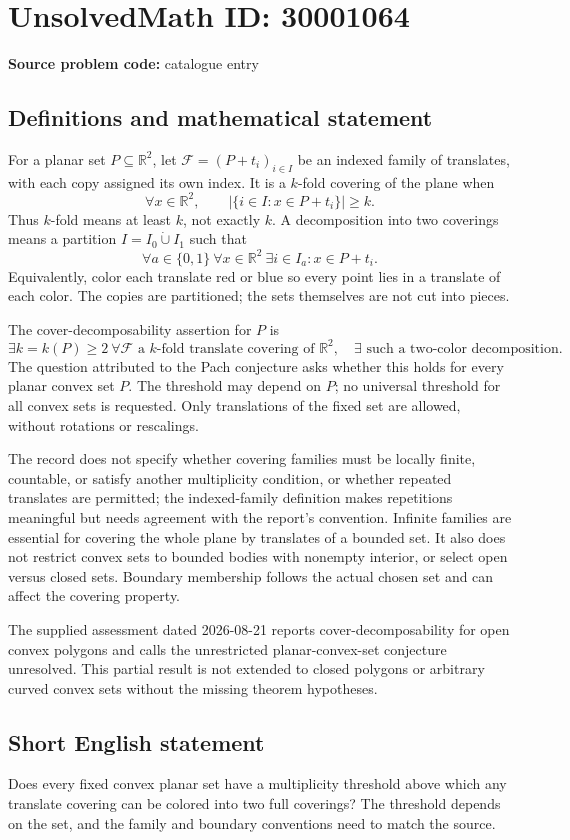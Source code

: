 \documentclass[11pt]{article}
\newcommand{\R}{\mathbb{R}}
\begin{document}
\section*{UnsolvedMath ID: 30001064}
\textbf{Source problem code:} catalogue entry
\subsection{Definitions and mathematical statement}
For a planar set \(P\subseteq\R^2\), let \(\mathcal F=(P+t_i)_{i\in I}\) be an indexed family of translates, with each copy assigned its own index. It is a \(k\)-fold covering of the plane when
\[
 \forall x\in\R^2,\qquad
 |\{i\in I:x\in P+t_i\}|\geq k.
\]
Thus \(k\)-fold means at least \(k\), not exactly \(k\). A decomposition into two coverings means a partition \(I=I_0\mathbin{\dot\cup}I_1\) such that
\[
 \forall a\in\{0,1\}\ \forall x\in\R^2\ \exists i\in I_a:
 x\in P+t_i.
\]
Equivalently, color each translate red or blue so every point lies in a translate of each color. The copies are partitioned; the sets themselves are not cut into pieces.

The cover-decomposability assertion for \(P\) is
\[
 \exists k=k(P)\geq2\ \forall\mathcal F\text{ a }k\text{-fold translate covering of }\R^2,
 \quad\exists\text{ such a two-color decomposition}.
\]
The question attributed to the Pach conjecture asks whether this holds for every planar convex set \(P\). The threshold may depend on \(P\); no universal threshold for all convex sets is requested. Only translations of the fixed set are allowed, without rotations or rescalings.

The record does not specify whether covering families must be locally finite, countable, or satisfy another multiplicity condition, or whether repeated translates are permitted; the indexed-family definition makes repetitions meaningful but needs agreement with the report's convention. Infinite families are essential for covering the whole plane by translates of a bounded set. It also does not restrict convex sets to bounded bodies with nonempty interior, or select open versus closed sets. Boundary membership follows the actual chosen set and can affect the covering property.

The supplied assessment dated 2026-08-21 reports cover-decomposability for open convex polygons and calls the unrestricted planar-convex-set conjecture unresolved. This partial result is not extended to closed polygons or arbitrary curved convex sets without the missing theorem hypotheses.
\subsection{Short English statement}
Does every fixed convex planar set have a multiplicity threshold above which any translate covering can be colored into two full coverings? The threshold depends on the set, and the family and boundary conventions need to match the source.
\end{document}
